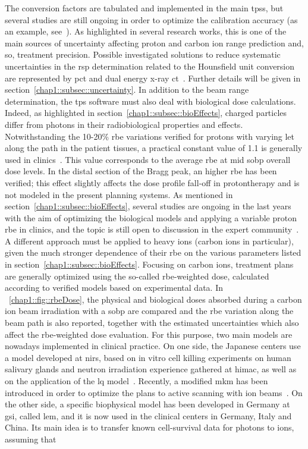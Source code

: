 The conversion factors are tabulated and implemented in the main \glspl{tps}, but several studies are still ongoing in order to optimize the calibration accuracy (as an example, see~\cite{Inaniwa2018}). As highlighted in several research works, this is one of the main sources of uncertainty affecting proton and carbon ion range prediction and, so, treatment precision. Possible investigated solutions to reduce systematic uncertainties in the \gls{rsp} determination related to the Hounsfield unit conversion are represented by \gls{pct} and dual energy x-ray \gls{ct}~\parencite{Yang2010}. Further details will be given in section~\ref{chap1::subsec::uncertainty}.
In addition to the beam range determination,  the \gls{tps} software must also deal with biological dose calculations. Indeed, as highlighted in section~\ref{chap1::subsec::bioEffects}, charged particles differ from photons in their radiobiological properties and effects. Notwithstanding the 10-20\% \gls{rbe} variations verified for protons with varying \gls{let} along the path in the patient tissues, a practical constant value of 1.1 is generally used in clinics~\parencite{Paganetti2002, ICRU2007}. This value corresponds to the average \gls{rbe} at mid \gls{sobp} overall dose levels. In the distal section of the Bragg peak, an higher \gls{rbe} has been verified; this effect slightly affects the dose profile fall-off in protontherapy and is not modeled in the present planning systems. As mentioned in section~\ref{chap1::subsec::bioEffects}, several studies are ongoing in the last years with the aim of optimizing the biological models and applying a variable proton \gls{rbe} in clinics, and the topic is still open to discussion in the expert community~\parencite{Paganetti2013, Paganetti2014, Unkelbach2018, Luhr2018, Willers2018}. A different approach must be applied to heavy ions (carbon ions in particular), given the much stronger dependence of their \gls{rbe} on the various parameters listed in section~\ref{chap1::subsec::bioEffects}. Focusing on carbon ions, treatment plans are generally optimized using the so-called \gls{rbe}-weighted dose, calculated according to verified models based on experimental data. In \figurename~\ref{chap1::fig::rbeDose}, the physical and biological doses absorbed during a carbon ion beam irradiation with a \gls{sobp} are compared and the \gls{rbe} variation along the beam path is also reported, together with the estimated uncertainties which also affect the \gls{rbe}-weighted dose evaluation. For this purpose, two main models are nowadays implemented in clinical practice. On one side, the Japanese centers use a model developed at \gls{nirs}, based on in vitro cell killing experiments on human salivary glands and neutron irradiation experience gathered at \gls{himac}, as well as on the application of the \gls{lq} model~\parencite{Matsufuji2007}. Recently, a modified \gls{mkm} has been introduced in order to optimize the plans to active scanning with ion beams~\parencite{Inaniwa2015}. On the other side, a specific biophysical model has been developed in Germany at \gls{gsi}, called \gls{lem}, and it is now used in the clinical centers in Germany, Italy and China. Its main idea is to transfer known cell-survival data for photons to ions, assuming that 